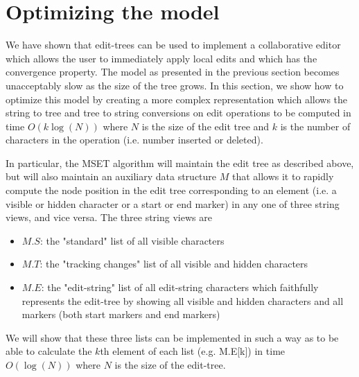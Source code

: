 \documentclass{amsart}
\begin{document}
\section{Optimizing the model}

We have shown that edit-trees can be used to implement a collaborative editor
which allows the user to immediately apply local edits and which has the convergence
property.  The model as presented in the previous section becomes unacceptably slow as the size of the tree grows.  In this section, we show how to optimize this model by creating a more complex representation which allows
the string to tree and tree to string conversions on edit operations to be computed
in time $O(k\log(N))$ where $N$ is the size of the edit tree and $k$ is the number
of characters in the operation (i.e. number inserted or deleted).

In particular, the MSET algorithm will maintain the edit tree as described above,
but will also maintain an auxiliary data structure $M$ that allows it to rapidly
compute the node position in the edit tree corresponding to an element (i.e. a visible or hidden character or a start or end marker) in any one
of three string views, and vice versa. The three string views are
\begin{itemize}
\item $M.S$: the "standard" list of all visible characters
\item $M.T$: the "tracking changes" list of all visible and hidden characters
\item $M.E$: the "edit-string" list of all edit-string characters which faithfully represents the edit-tree by showing all visible and hidden characters and all markers (both
start markers and end markers)
\end{itemize}
We will show that these three lists can be implemented in such a way as to be able
to calculate the $k$th element of each list (e.g. M.E[k]) in time $O(\log(N))$ where $N$ is the size of the edit-tree.
\end{document}
